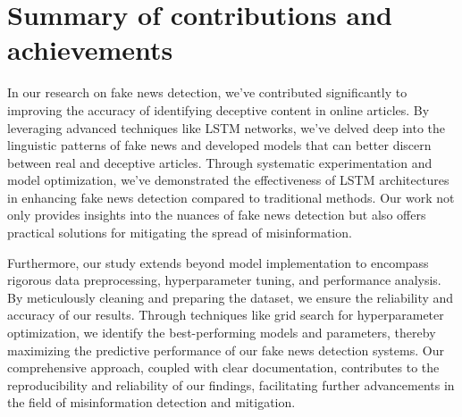 \section{Summary of contributions and achievements}
In our research on fake news detection, we've contributed significantly to improving the accuracy of identifying deceptive content in online articles. By leveraging advanced techniques like LSTM networks, we've delved deep into the linguistic patterns of fake news and developed models that can better discern between real and deceptive articles. Through systematic experimentation and model optimization, we've demonstrated the effectiveness of LSTM architectures in enhancing fake news detection compared to traditional methods. Our work not only provides insights into the nuances of fake news detection but also offers practical solutions for mitigating the spread of misinformation.

Furthermore, our study extends beyond model implementation to encompass rigorous data preprocessing, hyperparameter tuning, and performance analysis. By meticulously cleaning and preparing the dataset, we ensure the reliability and accuracy of our results. Through techniques like grid search for hyperparameter optimization, we identify the best-performing models and parameters, thereby maximizing the predictive performance of our fake news detection systems. Our comprehensive approach, coupled with clear documentation, contributes to the reproducibility and reliability of our findings, facilitating further advancements in the field of misinformation detection and mitigation.
\label{sec:intro_sum_results} %



